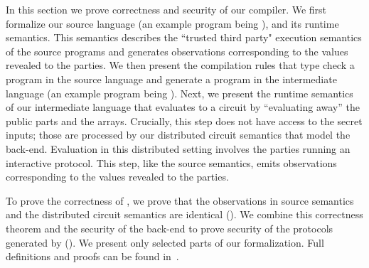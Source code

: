 In this section we prove correctness and security of our \tool compiler.
We first formalize our source language (an example program being
), and its runtime semantics.
This semantics describes the ``trusted third party"
execution semantics of the source programs and
generates observations corresponding to the values revealed to the
parties.
%
We then present the compilation rules that type check a program in the
source language and generate a program in the intermediate
language (an example program being ).
%
Next, we present the runtime semantics of our intermediate language
that evaluates to a circuit by ``evaluating away'' the public parts
and the arrays. Crucially, this step does not have access to the secret
inputs; those are processed by our distributed circuit semantics that
model the \mpc back-end.
%
Evaluation in this distributed setting involves the parties running an
interactive protocol. This step, like  the source semantics, emits
observations corresponding to the values revealed to the parties.

To prove the correctness of \tool, we prove that  the observations in
source semantics and the distributed circuit semantics are identical
().
We combine this correctness theorem and the security of the \mpc
back-end to prove security of the protocols generated by \tool
().
We present only selected parts of our formalization. Full definitions
and proofs can be found in~\cite{anonymized}.





